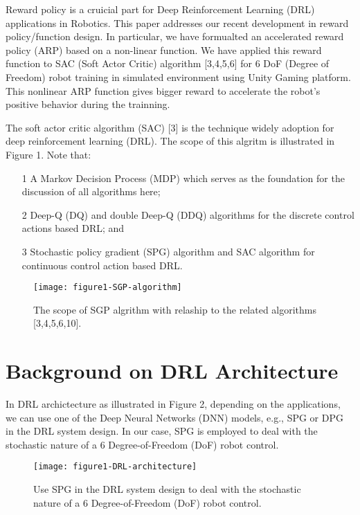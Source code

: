 \documentclass[conference]{IEEEtran}
\begin{document}
Reward policy is a cruicial part for Deep Reinforcement Learning (DRL)
applications in Robotics. 
This paper addresses
our recent development in reward policy/function design. 
In particular, 
we have formualted an accelerated reward policy (ARP) based on 
a non-linear function. We have applied this reward function 
to SAC (Soft Actor Critic) algorithm 
[3,4,5,6] 
for 6 DoF (Degree of Freedom)
robot training in simulated environment using Unity Gaming platform. 
This nonlinear ARP  
function gives bigger reward to accelerate the robot's positive 
behavior during the trainning.

The soft actor critic algorithm (SAC) [3] is the technique 
widely adoption for deep reinforcement learning (DRL).
The scope of this algritm is illustrated in Figure 1. Note
that:  

\begin{itemize}
\item[1] A Markov Decision Process (MDP) which serves 
as the foundation for the discussion of all algorithms here; 

\item[2] Deep-Q (DQ) and double Deep-Q (DDQ) algorithms 
for the discrete control actions based DRL; and 

\item[3] Stochastic policy gradient (SPG) algorithm and 
SAC algorithm for continuous control action 
based DRL.    
\end{itemize}
 
\begin{figure}[H] 
\centering
\texttt{[image: figure1-SGP-algorithm]} 
\caption{The scope of SGP algrithm with relaship to the related 
algorithms [3,4,5,6,10]. }
\label{figure1-SGP-algorithm} 
\end{figure} 

\section{Background on DRL Architecture}
In DRL archictecture as illustrated in Figure 2, depending
on the applications,  
we can use one of the Deep Neural Networks (DNN) models, 
e.g., SPG or DPG in the DRL system design. In our case, 
SPG is employed to deal with the stochastic nature of 
a 6 Degree-of-Freedom (DoF) robot control. 

\begin{figure}[H] 
\centering
\texttt{[image: figure1-DRL-architecture]} 
\caption{Use SPG in the DRL system design to deal with 
the stochastic nature of 
a 6 Degree-of-Freedom (DoF) robot control. }
\label{figure1-DRL-architecture} 
\end{figure} 
\end{document}
